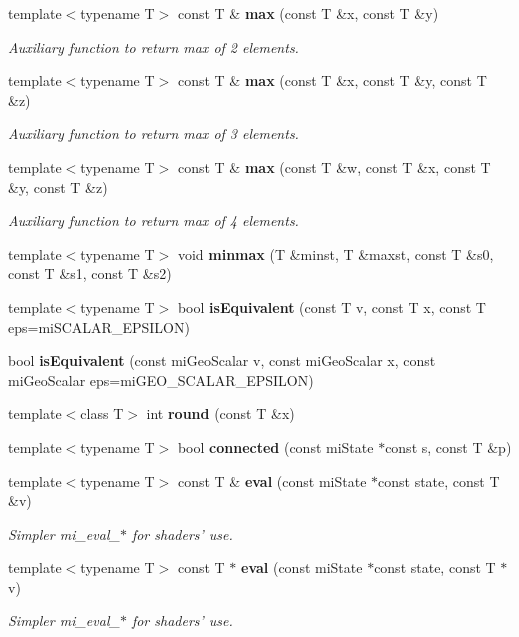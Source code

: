 \begin{CompactItemize}
template$<$typename T$>$ const T \& {\bf max} (const T \&x, const T \&y)
\begin{CompactList}\small\item\em Auxiliary function to return max of 2 elements. \item\end{CompactList}\item 
template$<$typename T$>$ const T \& {\bf max} (const T \&x, const T \&y, const T \&z)
\begin{CompactList}\small\item\em Auxiliary function to return max of 3 elements. \item\end{CompactList}\item 
template$<$typename T$>$ const T \& {\bf max} (const T \&w, const T \&x, const T \&y, const T \&z)
\begin{CompactList}\small\item\em Auxiliary function to return max of 4 elements. \item\end{CompactList}\item 
template$<$typename T$>$ void {\bf minmax} (T \&minst, T \&maxst, const T \&s0, const T \&s1, const T \&s2)
\item 
template$<$typename T$>$ bool {\bf is\-Equivalent} (const T v, const T x, const T eps=mi\-SCALAR\_\-EPSILON)
\item 
bool {\bf is\-Equivalent} (const mi\-Geo\-Scalar v, const mi\-Geo\-Scalar x, const mi\-Geo\-Scalar eps=mi\-GEO\_\-SCALAR\_\-EPSILON)
\item 
template$<$class T$>$ int {\bf round} (const T \&x)
\item 
template$<$typename T$>$ bool {\bf connected} (const mi\-State $\ast$const s, const T \&p)
\item 
template$<$typename T$>$ const T \& {\bf eval} (const mi\-State $\ast$const state, const T \&v)
\begin{CompactList}\small\item\em Simpler mi\_\-eval\_\-$\ast$ for shaders' use. \item\end{CompactList}\item 
template$<$typename T$>$ const T $\ast$ {\bf eval} (const mi\-State $\ast$const state, const T $\ast$v)
\begin{CompactList}\small\item\em Simpler mi\_\-eval\_\-$\ast$ for shaders' use. \item\end{CompactList}\item 

\end{CompactItemize}
